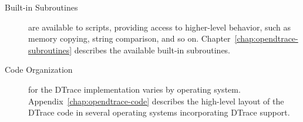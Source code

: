 \begin{description}
\item[Built-in Subroutines] are available to scripts, providing access to
  higher-level behavior, such as memory copying, string comparison, and so on.
  Chapter~\ref{chap:opendtrace-subroutines} describes the available built-in
  subroutines.

\item[Code Organization] for the DTrace implementation varies by operating
  system.
  Appendix~\ref{chap:opendtrace-code} describes the high-level layout of the
  DTrace code in several operating systems incorporating DTrace support.


\end{description}



